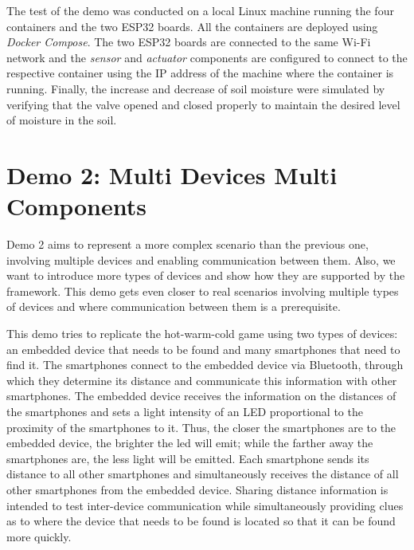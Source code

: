 The test of the demo was conducted on a local Linux machine running the four containers and the two ESP32 boards. All the containers are deployed
using \emph{Docker Compose}.
The two ESP32 boards are connected to the same Wi-Fi network and the \emph{sensor} and \emph{actuator} components are configured to connect to the
respective container using the IP address of the machine where the container is running.
Finally, the increase and decrease of soil moisture were simulated by verifying that the valve opened and closed properly to maintain the desired
level of moisture in the soil.



\section{Demo 2: Multi Devices Multi Components}
\label{sec:demo-2}

Demo 2 aims to represent a more complex scenario than the previous one, involving multiple devices and enabling communication between them.
Also, we want to introduce more types of devices and show how they are supported by the framework.
This demo gets even closer to real scenarios involving multiple types of devices and where communication between them is a prerequisite.

This demo tries to replicate the hot-warm-cold game using two types of devices: an embedded device that needs to be found and many smartphones that
need to find it. The smartphones connect to the embedded device via Bluetooth, through which they determine its distance and communicate
this information with other smartphones. The embedded device receives the information on the distances of the smartphones and sets a light intensity
of an LED proportional to the proximity of the smartphones to it. Thus, the closer the smartphones are to the embedded device, the brighter the led
will emit; while the farther away the smartphones are, the less light will be emitted.
Each smartphone sends its distance to all other smartphones and simultaneously receives the distance of all other smartphones from the embedded
device. Sharing distance information is intended to test inter-device communication while simultaneously providing clues as to where the device that
needs to be found is located so that it can be found more quickly.

